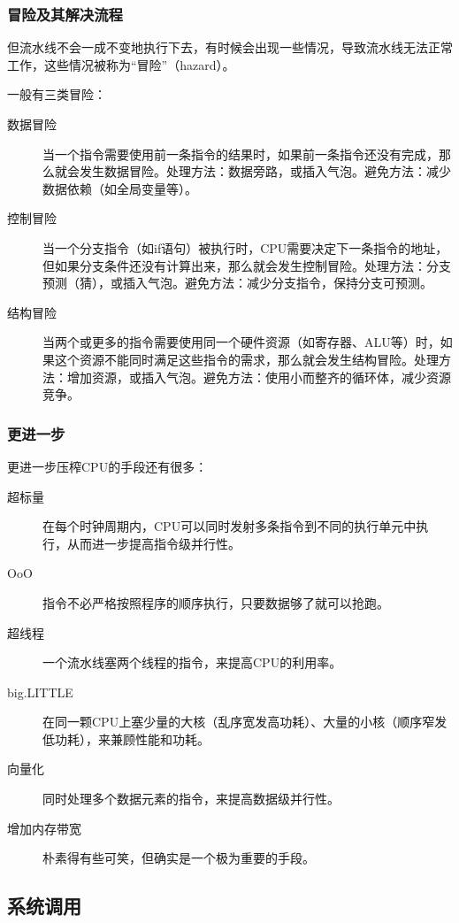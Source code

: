 \documentclass[fontset=none,aspectratio=1610]{ctexbeamer}
\begin{document}
\begin{frame}
    \frametitle{冒险及其解决流程}

    但流水线不会一成不变地执行下去，有时候会出现一些情况，导致流水线无法正常工作，这些情况被称为“冒险”（hazard）。

    一般有三类冒险：
    \begin{description}
        \item[数据冒险] 当一个指令需要使用前一条指令的结果时，如果前一条指令还没有完成，那么就会发生数据冒险。处理方法：数据旁路，或插入气泡。避免方法：减少数据依赖（如全局变量等）。
        \item[控制冒险] 当一个分支指令（如if语句）被执行时，CPU需要决定下一条指令的地址，但如果分支条件还没有计算出来，那么就会发生控制冒险。处理方法：分支预测（猜），或插入气泡。避免方法：减少分支指令，保持分支可预测。
        \item[结构冒险] 当两个或更多的指令需要使用同一个硬件资源（如寄存器、ALU等）时，如果这个资源不能同时满足这些指令的需求，那么就会发生结构冒险。处理方法：增加资源，或插入气泡。避免方法：使用小而整齐的循环体，减少资源竞争。
    \end{description}

\end{frame}

\begin{frame}
    \frametitle{更进一步}

    更进一步压榨CPU的手段还有很多：
    \begin{description}
        \item[超标量] 在每个时钟周期内，CPU可以同时发射多条指令到不同的执行单元中执行，从而进一步提高指令级并行性。
        \item[OoO] 指令不必严格按照程序的顺序执行，只要数据够了就可以抢跑。
        \item[超线程] 一个流水线塞两个线程的指令，来提高CPU的利用率。
        \item[big.LITTLE] 在同一颗CPU上塞少量的大核（乱序宽发高功耗）、大量的小核（顺序窄发低功耗），来兼顾性能和功耗。
        \item[向量化] 同时处理多个数据元素的指令，来提高数据级并行性。 
        \item[增加内存带宽] 朴素得有些可笑，但确实是一个极为重要的手段。
    \end{description}

\end{frame}

\subsection{系统调用}
\end{document}
